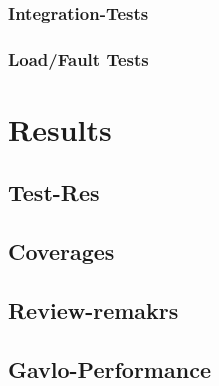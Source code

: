 		\subsection{Integration-Tests}
		\subsection{Load/Fault Tests}
		
	
\chapter{Results}
\label{cha:Results}
	\section{Test-Res}
	\section{Coverages}
	\section{Review-remakrs}
	\section{Gavlo-Performance}
	


